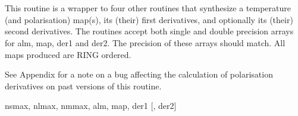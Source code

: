 \sloppy
{}\section[alm2map\_der*]{ }
\label{sub:alm2map_der}
\author{Eric Hivon}

\begin{facility}
{This routine is a wrapper to four other routines that synthesize a \healpix
  temperature (and polarisation) map(s), its (their) first derivatives, and optionally
  its (their) second derivatives.
The routines accept both single and double precision arrays for alm, map, der1 and
der2. The precision of these arrays should match. All maps produced are RING
ordered.

See  Appendix for a note on a bug
affecting the calculation of polarisation derivatives on past versions of this routine.
}
{\modAlmTools}
\end{facility}

\begin{f90format}
{nsmax, nlmax, nmmax, alm, map, der1 [, der2]}
\end{f90format}

